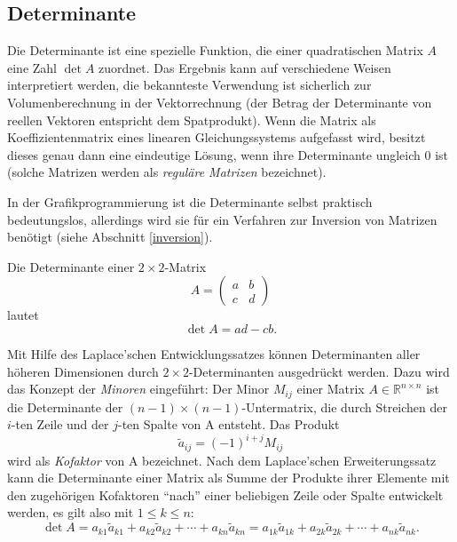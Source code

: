 \subsection{Determinante}
Die Determinante ist eine spezielle Funktion, die einer quadratischen Matrix $A$ eine Zahl $\det A$ zuordnet. Das Ergebnis kann auf verschiedene Weisen interpretiert werden, die bekannteste Verwendung ist sicherlich zur Volumenberechnung in der Vektorrechnung (der Betrag der Determinante von reellen Vektoren entspricht dem Spatprodukt). Wenn die Matrix als Koeffizientenmatrix eines linearen Gleichungssystems aufgefasst wird, besitzt dieses genau dann eine eindeutige Lösung, wenn ihre Determinante ungleich 0 ist (solche Matrizen werden als \emph{reguläre Matrizen} bezeichnet).

In der Grafikprogrammierung ist die Determinante selbst praktisch bedeutungslos, allerdings wird sie für ein Verfahren zur Inversion von Matrizen benötigt (siehe Abschnitt \ref{inversion}).

Die Determinante einer $2 \times 2$-Matrix
\begin{equation*}
 A = \begin{pmatrix}
      a & b \\
      c & d
     \end{pmatrix}
\end{equation*}
lautet
\begin{equation}
 \det A = ad - cb.
\end{equation}

Mit Hilfe des Laplace'schen Entwicklungssatzes können Determinanten aller höheren Dimensionen durch $2 \times 2$-Determinanten ausgedrückt werden. Dazu wird das Konzept der \emph{Minoren} eingeführt: Der Minor $M_{ij}$ einer Matrix $A \in \mathbb{R}^{n \times n}$ ist die Determinante der $(n-1) \times (n-1)$-Untermatrix, die durch Streichen der $i$-ten Zeile und der $j$-ten Spalte von A entsteht. Das Produkt
\begin{equation}
\label{cofactor}
 \tilde a_{ij} = (-1)^{i+j} M_{ij}
\end{equation}
wird als \emph{Kofaktor} von A bezeichnet. Nach dem Laplace'schen Erweiterungssatz kann die Determinante einer Matrix als Summe der Produkte ihrer Elemente mit den zugehörigen Kofaktoren \enquote{nach} einer beliebigen Zeile oder Spalte entwickelt werden, es gilt also mit $1 \leq k \leq n$:
\begin{equation}
 \det A = a_{k1} \tilde a_{k1} + a_{k2} \tilde a_{k2} + \cdots + a_{kn} \tilde a_{kn} = a_{1k} \tilde a_{1k} + a_{2k} \tilde a_{2k} + \cdots + a_{nk} \tilde a_{nk}.
\end{equation}

